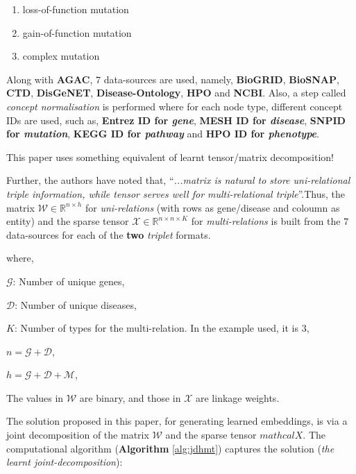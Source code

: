 \begin{sloppypar*}
    \begin{enumerate}
        \item loss-of-function mutation
        \item gain-of-function mutation
        \item complex mutation
    \end{enumerate}

    \noindent Along with \textbf{AGAC}, $7$ data-sources are used, namely,
    \textbf{BioGRID}, \textbf{BioSNAP}, \textbf{CTD}, \textbf{DisGeNET},
    \textbf{Disease-Ontology}, \textbf{HPO} and \textbf{NCBI}. Also, a step called
    \textit{concept normalisation} is performed where for each node
    type, different concept IDs are used, such as, \textbf{Entrez ID for
    \textit{gene}}, \textbf{MESH ID for \textit{disease}}, \textbf{SNPID for
    \textit{mutation}}, \textbf{KEGG ID for \textit{pathway}} and \textbf{HPO ID
    for \textit{phenotype}}.

    \begin{mybox}
        This paper uses something equivalent of learnt tensor/matrix decomposition!
    \end{mybox}

    Further, the authors have noted that, ``\textit{...matrix is
    natural to store uni-relational triple information, while tensor serves well
    for multi-relational triple}''.Thus, the matrix $\mathcal{W} \in \mathbb{R}^{n \times h}$
    for \textit{uni-relations} (with rows as gene/disease and coloumn as entity)
    and the sparse tensor $\mathcal{X} \in \mathbb{R}^{n \times n \times K}$
    for \textit{multi-relations} is built from the $7$ data-sources for each of
    the \textbf{two} \textit{triplet} formats.

    \noindent where,

    $\mathcal{G}$: Number of unique genes,

    $\mathcal{D}$: Number of unique diseases,

    $K$: Number of types for the multi-relation. In the example used, it is $3$,

    $n = \mathcal{G} + \mathcal{D}$,

    $h = \mathcal{G} + \mathcal{D} + \mathcal{M}$,
    
    \noindent The values in $\mathcal{W}$ are binary, and those in $\mathcal{X}$
    are linkage weights.\hfill \newline

    The solution proposed in this paper, for generating learned embeddings, is via
    a joint decomposition of the matrix $\mathcal{W}$ and the sparse tensor $mathcal{X}$.
    The computational algorithm (\textbf{Algorithm} \ref{alg:jdhmt})
    captures the solution (\textit{the learnt joint-decomposition}):


\end{sloppypar*}
